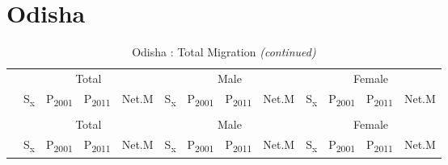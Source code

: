 \documentclass[
  12pt,
]{article}
\begin{document}
\pagebreak

\hypertarget{odisha}{%
\section{Odisha}\label{odisha}}

\begingroup\fontsize{9.7}{11.7}\selectfont

\begin{longtable}[t]{lcccccccccccc}
\caption{\label{tab:unnamed-chunk-10}Odisha : Total Migration}\\
\toprule
\multicolumn{1}{c}{ } & \multicolumn{4}{c}{Total} & \multicolumn{4}{c}{Male} & \multicolumn{4}{c}{Female} \\
\cmidrule(l{3pt}r{3pt}){2-5} \cmidrule(l{3pt}r{3pt}){6-9} \cmidrule(l{3pt}r{3pt}){10-13}
  & S\textsubscript{x} & P\textsubscript{2001} & P\textsubscript{2011} & Net.M & S\textsubscript{x} & P\textsubscript{2001} & P\textsubscript{2011} & Net.M & S\textsubscript{x} & P\textsubscript{2001} & P\textsubscript{2011} & Net.M\\
\midrule
\endfirsthead
\caption[]{Odisha : Total Migration \textit{(continued)}}\\
\toprule
\multicolumn{1}{c}{ } & \multicolumn{4}{c}{Total} & \multicolumn{4}{c}{Male} & \multicolumn{4}{c}{Female} \\
\cmidrule(l{3pt}r{3pt}){2-5} \cmidrule(l{3pt}r{3pt}){6-9} \cmidrule(l{3pt}r{3pt}){10-13}
  & S\textsubscript{x} & P\textsubscript{2001} & P\textsubscript{2011} & Net.M & S\textsubscript{x} & P\textsubscript{2001} & P\textsubscript{2011} & Net.M & S\textsubscript{x} & P\textsubscript{2001} & P\textsubscript{2011} & Net.M\\
\midrule
\endhead


\end{longtable}
\end{document}
